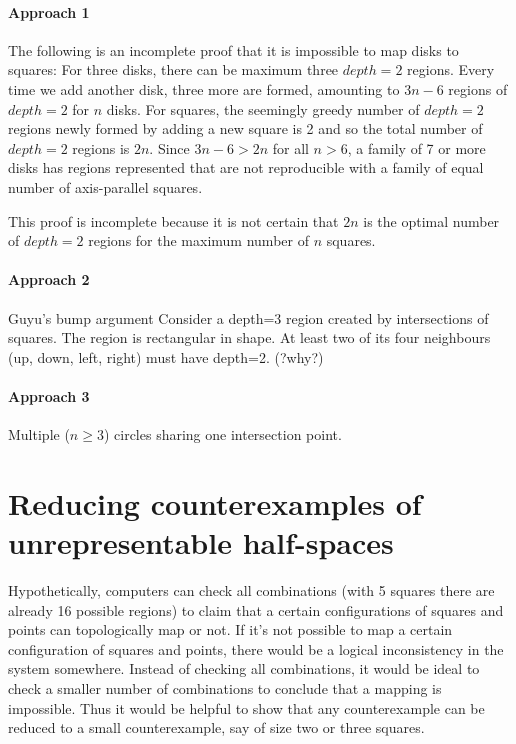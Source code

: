 \documentclass{NSF}
\begin{document}
\paragraph{Approach 1} The following is an incomplete proof that it is impossible to map disks to squares:
For three disks, there can be maximum three $depth=2$ regions. Every time we add another disk, three more are formed, amounting to $3n-6$ regions of $depth=2$   for $n$ disks. 
For squares, the seemingly greedy number of $depth=2$  regions newly formed by adding a new square is 2 and so the total number of $depth=2$ regions is $2n$.
Since $3n-6 > 2n$ for all $n > 6$, a family of 7 or more disks has regions represented that are not reproducible with a family of equal number of axis-parallel squares.

This proof is incomplete because it is not certain that $2n$ is the optimal number of $depth=2$ regions for the maximum number of $n$ squares.

\paragraph{Approach 2} Guyu's bump argument
Consider a depth=3 region created by intersections of squares. The region is rectangular in shape. At least two of its four neighbours (up, down, left, right) must have depth=2. (?why?)

\paragraph{Approach 3} Multiple ($n\geq3$) circles sharing one intersection point.


\section{Reducing counterexamples of unrepresentable half-spaces}
Hypothetically, computers can check all combinations (with 5 squares there are already 16 possible regions) to claim that a certain configurations of squares and points can topologically map or not. If it's not possible to map a certain configuration of squares and points, there would be a logical inconsistency in the system somewhere. Instead of checking all combinations, it would be ideal to check a smaller number of combinations  to conclude that a mapping is impossible. Thus it would be helpful to show that any counterexample can be reduced to a small counterexample, say of size two or three squares.
\end{document}
